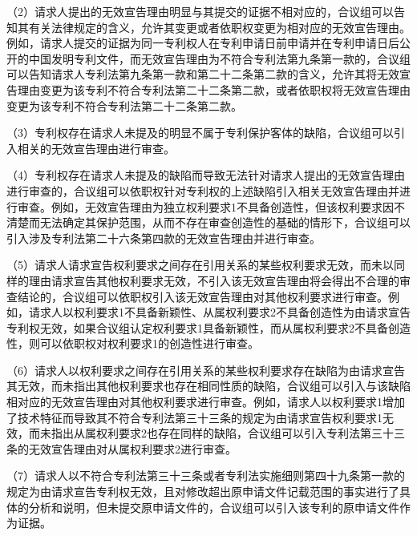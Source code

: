 {\setlength{\parindent}{17.1bp}（2）请求人提出的无效宣告理由明显与其提交的证据不相对应的，合议组可以告知其有关法律规定的含义，允许其变更或者依职权变更为相对应的无效宣告理由。例如，请求人提交的证据为同一专利权人在专利申请日前申请并在专利申请日后公开的中国发明专利文件，而无效宣告理由为不符合专利法第九条第一款的，合议组可以告知请求人专利法第九条第一款和第二十二条第二款的含义，允许其将无效宣告理由变更为该专利不符合专利法第二十二条第二款，或者依职权将无效宣告理由变更为该专利不符合专利法第二十二条第二款。\par}

{\setlength{\parindent}{17.1bp}（3）专利权存在请求人未提及的明显不属于专利保护客体的缺陷，合议组可以引入相关的无效宣告理由进行审查。\par}

{\setlength{\parindent}{17.1bp}（4）专利权存在请求人未提及的缺陷而导致无法针对请求人提出的无效宣告理由进行审查的，合议组可以依职权针对专利权的上述缺陷引入相关无效宣告理由并进行审查。例如，无效宣告理由为独立权利要求1不具备创造性，但该权利要求因不清楚而无法确定其保护范围，从而不存在审查创造性的基础的情形下，合议组可以引入涉及专利法第二十六条第四款的无效宣告理由并进行审查。\par}

{\setlength{\parindent}{17.1bp}（5）请求人请求宣告权利要求之间存在引用关系的某些权利要求无效，而未以同样的理由请求宣告其他权利要求无效，不引入该无效宣告理由将会得出不合理的审查结论的，合议组可以依职权引入该无效宣告理由对其他权利要求进行审查。例如，请求人以权利要求1不具备新颖性、从属权利要求2不具备创造性为由请求宣告专利权无效，如果合议组认定权利要求1具备新颖性，而从属权利要求2不具备创造性，则可以依职权对权利要求1的创造性进行审查。\par}

{\setlength{\parindent}{17.1bp}（6）请求人以权利要求之间存在引用关系的某些权利要求存在缺陷为由请求宣告其无效，而未指出其他权利要求也存在相同性质的缺陷，合议组可以引入与该缺陷相对应的无效宣告理由对其他权利要求进行审查。例如，请求人以权利要求1增加了技术特征而导致其不符合专利法第三十三条的规定为由请求宣告权利要求1无效，而未指出从属权利要求2也存在同样的缺陷，合议组可以引入专利法第三十三条的无效宣告理由对从属权利要求2进行审查。\par}

{\setlength{\parindent}{17.1bp}（7）请求人以不符合专利法第三十三条或者专利法实施细则第四十九条第一款的规定为由请求宣告专利权无效，且对修改超出原申请文件记载范围的事实进行了具体的分析和说明，但未提交原申请文件的，合议组可以引入该专利的原申请文件作为证据。\par}

